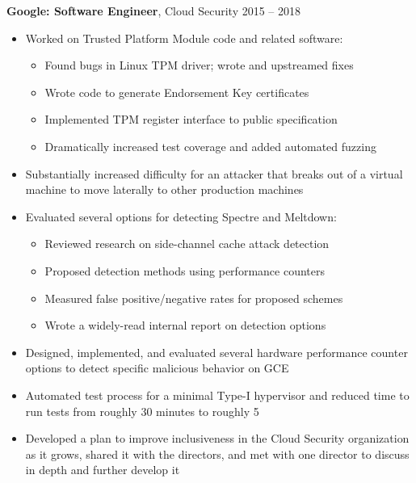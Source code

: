 \documentclass[margin]{res} \usepackage{hyperref}
\begin{document}
\begin{resume}
  \textbf{Google: Software Engineer}, Cloud Security \hfill 2015 -- 2018
  \begin{minipage}{0.84\textwidth}
    \vspace{0.2em}
    \begin{itemize} \itemsep -1pt
        \item Worked on Trusted Platform Module code and related software:
          \vspace{-0.5em}
          \begin{itemize} \itemsep -1pt
            \item Found bugs in Linux TPM driver; wrote and upstreamed fixes
            \item Wrote code to generate Endorsement Key certificates
            \item Implemented TPM register interface to public specification
            \item Dramatically increased test coverage and added automated fuzzing
          \end{itemize}
        \item Substantially increased difficulty for an attacker that breaks
          out of a virtual machine to move laterally to other production
          machines
        \item Evaluated several options for detecting Spectre and Meltdown:
          \vspace{-0.5em}
          \begin{itemize} \itemsep -1pt
            \item Reviewed research on side-channel cache attack detection
            \item Proposed detection methods using performance counters
            \item Measured false positive/negative rates for proposed schemes
            \item Wrote a widely-read internal report on detection options
          \end{itemize}
        \item Designed, implemented, and evaluated several hardware
          performance counter options to detect specific
          malicious behavior on GCE
        \item Automated test process for a minimal Type-I hypervisor and
          reduced time to run tests from roughly 30 minutes to roughly 5
        \item Developed a plan to improve inclusiveness in the Cloud Security
          organization as it grows, shared it with the directors,
          and met with one director to discuss in depth and further develop it
    \end{itemize}
  \end{minipage}


\end{resume}
\end{document}
